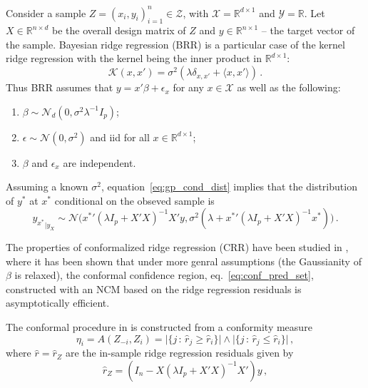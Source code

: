 \documentclass{ITaSconf}
\newcommand{\Ncal}{\mathcal{N}}
\newcommand{\Kcal}{\mathcal{K}}
\newcommand{\Xcal}{\mathcal{X}}
\newcommand{\Ycal}{\mathcal{Y}}
\newcommand{\Zcal}{\mathcal{Z}}
\newcommand{\Real}{\mathbb{R}}
\begin{document}
Consider a sample $Z = (x_i, y_i)_{i=1}^n \in \Zcal$, with $\Xcal = \Real^{d\times 1}$
and $\Ycal=\Real$. Let $X\in\Real^{n\times d}$ be the overall design matrix of $Z$
and $y\in\Real^{n\times1}$ -- the target vector of the sample. Bayesian ridge regression
(BRR) is a particular case of the kernel ridge regression with the kernel being
the inner product in $\Real^{d\times1}$:
\begin{equation*}
  \Kcal(x,x') = \sigma^2(\lambda \delta_{x,x'} + \langle x,x'\rangle) \,.
\end{equation*}
Thus BRR assumes that $y = x'\beta + \epsilon_x$ for any $x\in\Xcal$ as well as
the following:
\begin{enumerate}
  \item $\beta\sim\Ncal_d(0, \sigma^2 \lambda^{-1} I_p)$;
  \item $\epsilon\sim \Ncal(0, \sigma^2)$ and iid for all $x\in \Real^{d\times 1}$;
  \item $\beta$ and $\epsilon_x$ are independent.
\end{enumerate}
Assuming a known $\sigma^2$, equation~\ref{eq:gp_cond_dist} implies that the distribution
of $y^*$ at $x^*$ conditional on the obseved sample is
\begin{equation} \label{eq:brr_cond_dist}
  {y_{x^*}}_{|y_X}
    \sim \Ncal\bigl( x^*'(\lambda I_p + X'X)^{-1}X'y,
      \sigma^2 (\lambda + x^*' (\lambda I_p + X'X)^{-1} x^* ) \bigr) \,.
\end{equation}

The properties of conformalized ridge regression (CRR) have been studied in \cite{BurVovk2014},
where it has been shown that under more genral assumptions (the Gaussianity of $\beta$
is relaxed), the conformal confidence region, eq.~\ref{eq:conf_pred_set}, constructed
with an NCM based on the ridge regression residuals is asymptotically efficient.

The conformal procedure in \cite{BurVovk2014} is constructed from a conformity measure
\begin{equation} \label{eq:crr_ncm}
  \eta_i = A(Z_{-i}, Z_i)
    = \bigl\lvert\{j\,:\, \hat{r}_j \geq \hat{r}_i \} \bigr\rvert \wedge
      \bigl\lvert\{j\,:\, \hat{r}_j \leq \hat{r}_i \} \bigr\rvert \,,
\end{equation}
where $\hat{r} = \hat{r}_Z$ are the in-sample ridge regression residuals given by
\begin{equation} \label{eq:rr_insample_resid}
  \hat{r}_Z = (I_n - X (\lambda I_p + X'X)^{-1} X') y \,,
\end{equation}
\end{document}
